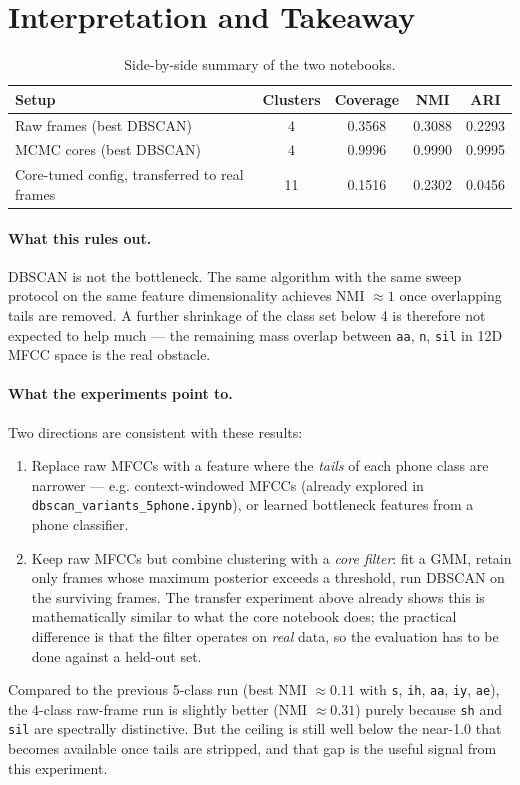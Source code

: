 \documentclass[11pt]{article}
\begin{document}
\section*{Interpretation and Takeaway}

\begin{table}[H]
\centering
\caption{Side-by-side summary of the two notebooks.}
\begin{tabular}{lcccc}
\toprule
Setup & Clusters & Coverage & NMI & ARI \\
\midrule
Raw frames (best DBSCAN) & 4 & 0.3568 & 0.3088 & 0.2293 \\
MCMC cores (best DBSCAN) & 4 & 0.9996 & 0.9990 & 0.9995 \\
Core-tuned config, transferred to real frames & 11 & 0.1516 & 0.2302 & 0.0456 \\
\bottomrule
\end{tabular}
\end{table}

\paragraph{What this rules out.} DBSCAN is not the bottleneck. The same algorithm with the same sweep protocol on the same feature dimensionality achieves NMI $\approx 1$ once overlapping tails are removed. A further shrinkage of the class set below 4 is therefore not expected to help much --- the remaining mass overlap between \texttt{aa}, \texttt{n}, \texttt{sil} in 12D MFCC space is the real obstacle.

\paragraph{What the experiments point to.} Two directions are consistent with these results:
\begin{enumerate}
\item Replace raw MFCCs with a feature where the \emph{tails} of each phone class are narrower --- e.g. context-windowed MFCCs (already explored in \texttt{dbscan\_variants\_5phone.ipynb}), or learned bottleneck features from a phone classifier.
\item Keep raw MFCCs but combine clustering with a \emph{core filter}: fit a GMM, retain only frames whose maximum posterior exceeds a threshold, run DBSCAN on the surviving frames. The transfer experiment above already shows this is mathematically similar to what the core notebook does; the practical difference is that the filter operates on \emph{real} data, so the evaluation has to be done against a held-out set.
\end{enumerate}

Compared to the previous 5-class run (best NMI $\approx 0.11$ with \texttt{s}, \texttt{ih}, \texttt{aa}, \texttt{iy}, \texttt{ae}), the 4-class raw-frame run is slightly better (NMI $\approx 0.31$) purely because \texttt{sh} and \texttt{sil} are spectrally distinctive. But the ceiling is still well below the near-1.0 that becomes available once tails are stripped, and that gap is the useful signal from this experiment.
\end{document}
